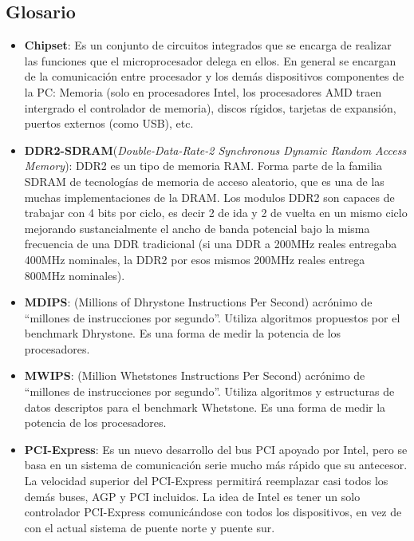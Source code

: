 \newpage
\subsection{Glosario}

\begin{itemize}

\item \textbf{Chipset}: Es un conjunto de circuitos integrados que se encarga 
de realizar las funciones que el microprocesador delega en ellos. En general
 se encargan de la comunicación entre procesador y los demás dispositivos 
componentes de la PC: Memoria (solo en procesadores Intel, los procesadores 
AMD traen intergrado el controlador de memoria), discos rígidos, tarjetas de 
expansión, puertos externos (como USB), etc.

\item \textbf{DDR2-SDRAM}(\textit{Double-Data-Rate-2 Synchronous Dynamic Random Access
Memory}): DDR2 es un tipo de memoria RAM. Forma parte de la familia SDRAM de
tecnologías de memoria de acceso aleatorio, que es una de las muchas
implementaciones de la DRAM. Los modulos DDR2 son capaces de trabajar con 4 bits
por ciclo, es decir 2 de ida y 2 de vuelta en un mismo ciclo mejorando
sustancialmente el ancho de banda potencial bajo la misma frecuencia de una DDR
tradicional (si una DDR a 200MHz reales entregaba 400MHz nominales, la DDR2 por
esos mismos 200MHz reales entrega 800MHz nominales).

\item \textbf{MDIPS}: (Millions of Dhrystone Instructions Per Second) acrónimo de
 ``millones de instrucciones por segundo''. Utiliza algoritmos propuestos
por el benchmark Dhrystone. Es una forma de medir la potencia de los
 procesadores. 

\item \textbf{MWIPS}: (Million Whetstones Instructions Per Second) acrónimo de
 ``millones de instrucciones por segundo''. Utiliza algoritmos y estructuras de datos
descriptos para el benchmark Whetstone. Es una forma de medir la potencia de los
 procesadores. 


\item \textbf{PCI-Express}: Es un nuevo desarrollo del bus PCI apoyado por
Intel, pero se basa en un sistema de comunicación serie mucho más rápido que su
antecesor. La velocidad superior del PCI-Express permitirá reemplazar casi todos
los demás buses, AGP y PCI incluidos. La idea de Intel es tener un solo
controlador PCI-Express comunicándose con todos los dispositivos, en vez de con
el actual sistema de puente norte y puente sur.


\end{itemize}
